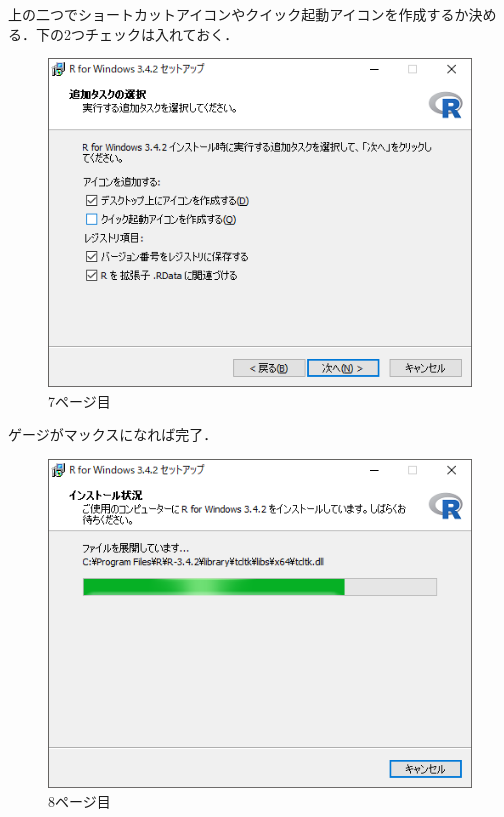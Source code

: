 \newpage

上の二つでショートカットアイコンやクイック起動アイコンを作成するか決める．下の2つチェックは入れておく．

\begin{figure}[!htbp]
\centering 
\includegraphics[width=13cm]{rinstall7.png}
\caption{7ページ目}
\end{figure}

\newpage

ゲージがマックスになれば完了．

\begin{figure}[!htbp]
\centering 
\includegraphics[width=13cm]{rinstall8.png}
\caption{8ページ目}
\end{figure}

